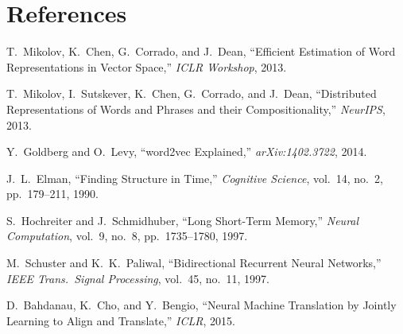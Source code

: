 \documentclass[12pt, a4paper]{article}
\begin{document}
\newpage
\section*{References}

\begin{enumerate}[label={[\arabic*]}]
  \item T.\ Mikolov, K.\ Chen, G.\ Corrado, and J.\ Dean, ``Efficient Estimation of Word Representations in Vector Space,'' \textit{ICLR Workshop}, 2013.
  \item T.\ Mikolov, I.\ Sutskever, K.\ Chen, G.\ Corrado, and J.\ Dean, ``Distributed Representations of Words and Phrases and their Compositionality,'' \textit{NeurIPS}, 2013.
  \item Y.\ Goldberg and O.\ Levy, ``word2vec Explained,'' \textit{arXiv:1402.3722}, 2014.
  \item J.\ L.\ Elman, ``Finding Structure in Time,'' \textit{Cognitive Science}, vol.\ 14, no.\ 2, pp.\ 179--211, 1990.
  \item S.\ Hochreiter and J.\ Schmidhuber, ``Long Short-Term Memory,'' \textit{Neural Computation}, vol.\ 9, no.\ 8, pp.\ 1735--1780, 1997.
  \item M.\ Schuster and K.\ K.\ Paliwal, ``Bidirectional Recurrent Neural Networks,'' \textit{IEEE Trans.\ Signal Processing}, vol.\ 45, no.\ 11, 1997.
  \item D.\ Bahdanau, K.\ Cho, and Y.\ Bengio, ``Neural Machine Translation by Jointly Learning to Align and Translate,'' \textit{ICLR}, 2015.
\end{enumerate}
\end{document}
